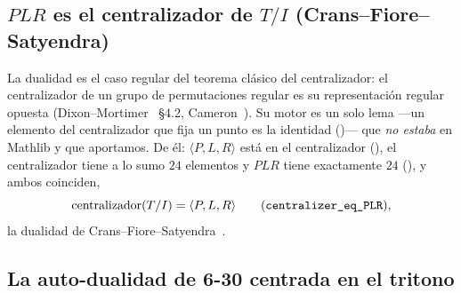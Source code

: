 \subsection{$PLR$ es el centralizador de $T/I$ (Crans--Fiore--Satyendra)}\label{sec:p2-cfs}


La dualidad es el caso regular del teorema clásico del centralizador: el centralizador de un grupo de
permutaciones regular es su representación regular opuesta (Dixon--Mortimer~\cite{DM} \S4.2,
Cameron~\cite{Cam}). Su motor es un solo lema ---un elemento del centralizador que fija un punto es la
identidad ()--- que \emph{no estaba} en Mathlib y que aportamos. De
él: $\langle P,L,R\rangle$ está en el centralizador (), el centralizador tiene a
lo sumo $24$ elementos y $PLR$ tiene exactamente $24$ (), y ambos coinciden,
\[
  \mathrm{centralizador}(T/I)=\langle P,L,R\rangle\qquad(\texttt{centralizer\_eq\_PLR}),
\]
la dualidad de Crans--Fiore--Satyendra~\cite{CFS}.

\subsection{La auto-dualidad de 6-30 centrada en el tritono}\label{sec:p2-sixthirty}


